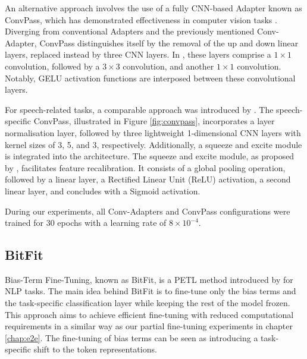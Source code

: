An alternative approach involves the use of a fully CNN-based Adapter known as ConvPass, which has demonstrated effectiveness in computer vision tasks \cite{jie2022convolutional}. Diverging from conventional Adapters and the previously mentioned Conv-Adapter, ConvPass distinguishes itself by the removal of the up and down linear layers, replaced instead by three CNN layers. In \cite{jie2022convolutional}, these layers comprise a $1 \times 1$ convolution, followed by a $3 \times 3$ convolution, and another $1 \times 1$ convolution. Notably, GELU activation functions are interposed between these convolutional layers.

For speech-related tasks, a comparable approach was introduced by \cite{li2023evaluating}. The speech-specific ConvPass, illustrated in Figure \ref{fig:convpass}, incorporates a layer normalisation layer, followed by three lightweight 1-dimensional CNN layers with kernel sizes of 3, 5, and 3, respectively. Additionally, a squeeze and excite module is integrated into the architecture. The squeeze and excite module, as proposed by \cite{hu2018squeeze}, facilitates feature recalibration. It consists of a global pooling operation, followed by a linear layer, a Rectified Linear Unit (ReLU) activation, a second linear layer, and concludes with a Sigmoid activation.

During our experiments, all Conv-Adapters and ConvPass configurations were trained for 30 epochs with a learning rate of $8 \times 10^{-4}$.

\subsection{BitFit}
Bias-Term Fine-Tuning, known as BitFit, is a PETL method introduced by \cite{ben-zaken-etal-2022-bitfit} for NLP tasks. The main idea behind BitFit is to fine-tune only the bias terms and the task-specific classification layer while keeping the rest of the model frozen. This approach aims to achieve efficient fine-tuning with reduced computational requirements in a similar way as our partial fine-tuning experiments in chapter \ref{chap:e2e}. The fine-tuning of bias terms can be seen as introducing a task-specific shift to the token representations.

